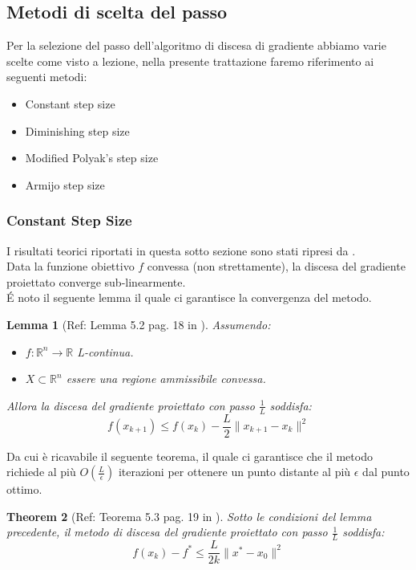 \documentclass[12pt]{extarticle}
\newtheorem{theorem}{Theorem}[section]
\newtheorem{lemma}[theorem]{Lemma}
\begin{document}
\subsection{Metodi di scelta del passo}
Per la selezione del passo dell'algoritmo di discesa di gradiente abbiamo varie scelte come visto a lezione, nella presente trattazione faremo riferimento ai seguenti metodi:
\begin{itemize}
    \item Constant step size
    \item Diminishing step size
    \item Modified Polyak's step size
    \item Armijo step size
\end{itemize}
\subsubsection{Constant Step Size}
I risultati teorici riportati in questa sotto sezione sono stati ripresi da \cite{notesfirstom}.\\
Data la funzione obiettivo $f$ convessa (non strettamente), la discesa del gradiente proiettato converge sub-linearmente.\\
\'E noto il seguente lemma il quale ci garantisce la convergenza del metodo.\\
\begin{lemma}[Ref: Lemma 5.2 pag. 18 in \cite{notesfirstom}]
Assumendo:
\begin{itemize}
    \item $f : \mathbb{R}^n \to \mathbb{R}$ L-continua.
    \item $X \subset \mathbb{R}^n$ essere una regione ammissibile convessa.
\end{itemize}
Allora la discesa del gradiente proiettato con passo $\frac{1}{L}$ soddisfa:
\[f(x_{k+1}) \leq f(x_k) - \frac{L}{2}\|x_{k+1} - x_k\|^2 \]
\end{lemma}
Da cui è ricavabile il seguente teorema, il quale ci garantisce che il metodo richiede al più $O(\frac{L}{\epsilon})$ iterazioni per ottenere un punto distante al più $\epsilon$ dal punto ottimo.
\begin{theorem}[Ref: Teorema 5.3 pag. 19 in \cite{notesfirstom}]
Sotto le condizioni del lemma precedente, il metodo di discesa del gradiente proiettato con passo $\frac{1}{L}$ soddisfa:
\[f(x_k) - f^* \leq \frac{L}{2k}\| x^* - x_0 \|^2\]
\end{theorem}
\end{document}
